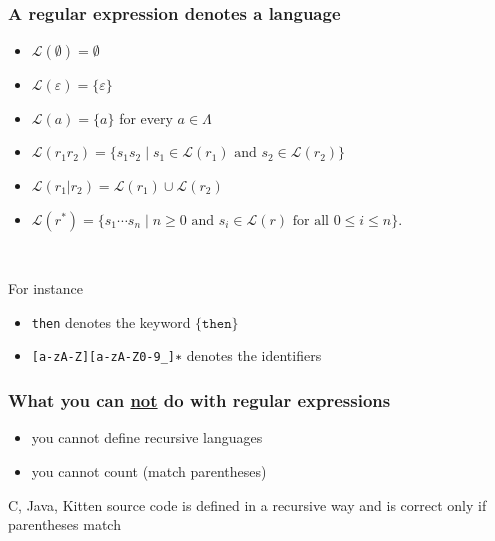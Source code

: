\documentclass[11pt]{beamer}  %
\begin{document}
\begin{frame}\frametitle{A regular expression denotes a language}

\begin{greenbox}{}
\begin{itemize}
\item $\mathcal{L}(\emptyset)=\emptyset$
\item $\mathcal{L}(\varepsilon)=\{\varepsilon\}$
\item $\mathcal{L}(a)=\{a\}$ for every $a\in\Lambda$
\item $\mathcal{L}(r_1r_2)=\{s_1s_2\mid s_1\in\mathcal{L}(r_1)\text{ and }
      s_2\in\mathcal{L}(r_2)\}$
\item $\mathcal{L}(r_1|r_2)=\mathcal{L}(r_1)\cup\mathcal{L}(r_2)$
\item $\mathcal{L}(r^*)=\{s_1\cdots s_n\mid n\ge 0\text{ and }s_i\in
      \mathcal{L}(r)\text{ for all }0\le i\le n\}$.
\end{itemize}
\end{greenbox}

\mbox{}\\

\begin{pinkbox}{For instance}
\begin{itemize}
\item \texttt{then} denotes the keyword $\{\mathtt{then}\}$
\item \texttt{[a-zA-Z][a-zA-Z0-9\_]∗} denotes the identifiers
\end{itemize}
\end{pinkbox}

\end{frame}

\begin{frame}\frametitle{What you can \underline{not} do with regular expressions}

\begin{greenbox}{}
\begin{itemize}
\item you cannot define recursive languages
\item you cannot count (match parentheses)
\end{itemize}
\end{greenbox}

\begin{center}
C, Java, Kitten source code is defined in a recursive way and is correct only if
parentheses match
\end{center}

\end{frame}
\end{document}
